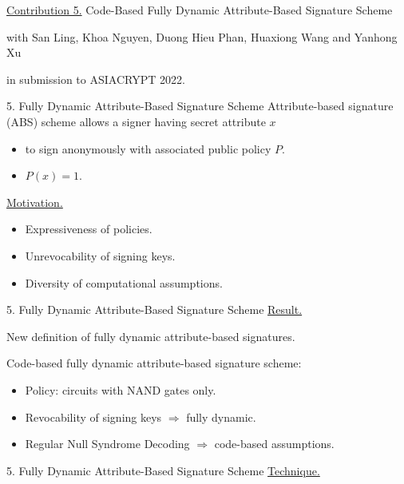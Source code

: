 \begin{frame}
	\underline{Contribution 5.} Code-Based Fully Dynamic Attribute-Based Signature Scheme
	
	{\small with San Ling, Khoa Nguyen, Duong Hieu Phan, Huaxiong Wang and Yanhong Xu}
	
	in submission to ASIACRYPT 2022.
\end{frame}

\begin{frame}{5. Fully Dynamic Attribute-Based Signature Scheme}
	Attribute-based signature (ABS) scheme allows a signer having secret attribute $x$
	\begin{itemize}
		\item to sign anonymously with associated public policy $P$.
		\item $P(x) = 1$.
	\end{itemize}
	
	\underline{Motivation.}
	\begin{itemize}
		\item Expressiveness of policies.
		\item Unrevocability of signing keys.
		\item Diversity of computational assumptions.
	\end{itemize}
\end{frame}

\begin{frame}{5. Fully Dynamic Attribute-Based Signature Scheme}
	\underline{Result.} 
	
	New definition of fully dynamic attribute-based signatures.
	
	Code-based fully dynamic attribute-based signature scheme:
	\begin{itemize}
		\item Policy: circuits with NAND gates only.
		\item Revocability of signing keys $\Rightarrow$ fully dynamic.
		\item Regular Null Syndrome Decoding $\Rightarrow$ code-based assumptions.
	\end{itemize}
\end{frame}

\begin{frame}{5. Fully Dynamic Attribute-Based Signature Scheme}
	\underline{Technique.}
	
\end{frame}